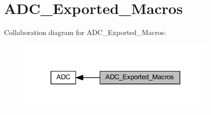 \hypertarget{group___a_d_c___exported___macros}{}\section{A\+D\+C\+\_\+\+Exported\+\_\+\+Macros}
\label{group___a_d_c___exported___macros}
Collaboration diagram for A\+D\+C\+\_\+\+Exported\+\_\+\+Macros\+:
\nopagebreak
\begin{figure}[H]
\begin{center}
\leavevmode
\includegraphics[width=272pt]{group___a_d_c___exported___macros}
\end{center}
\end{figure}
